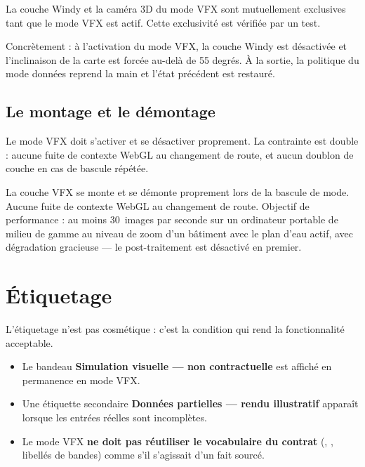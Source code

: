 \begin{invariant}
La couche Windy et la caméra 3D du mode VFX sont mutuellement exclusives tant
que le mode VFX est actif. Cette exclusivité est vérifiée par un test.
\end{invariant}

Concrètement : à l'activation du mode VFX, la couche Windy est désactivée et
l'inclinaison de la carte est forcée au-delà de 55 degrés. À la sortie, la
politique du mode données reprend la main et l'état précédent est restauré.

\subsection{Le montage et le démontage}

Le mode VFX doit s'activer et se désactiver proprement. La contrainte est
double : aucune fuite de contexte WebGL au changement de route, et aucun
doublon de couche en cas de bascule répétée.

\begin{invariant}
La couche VFX se monte et se démonte proprement lors de la bascule de mode.
Aucune fuite de contexte WebGL au changement de route. Objectif de performance :
au moins 30~images par seconde sur un ordinateur portable de milieu de gamme au
niveau de zoom d'un bâtiment avec le plan d'eau actif, avec dégradation
gracieuse — le post-traitement est désactivé en premier.
\end{invariant}

\section{Étiquetage}

L'étiquetage n'est pas cosmétique : c'est la condition qui rend la
fonctionnalité acceptable.

\begin{itemize}[leftmargin=1.4em]
  \item Le bandeau \og \textbf{Simulation visuelle — non contractuelle} \fg{}
        est affiché en permanence en mode VFX.
  \item Une étiquette secondaire \og \textbf{Données partielles — rendu
        illustratif} \fg{} apparaît lorsque les entrées réelles sont
        incomplètes.
  \item Le mode VFX \textbf{ne doit pas réutiliser le vocabulaire du contrat}
        (, , libellés de bandes) comme s'il
        s'agissait d'un fait sourcé.
\end{itemize}

